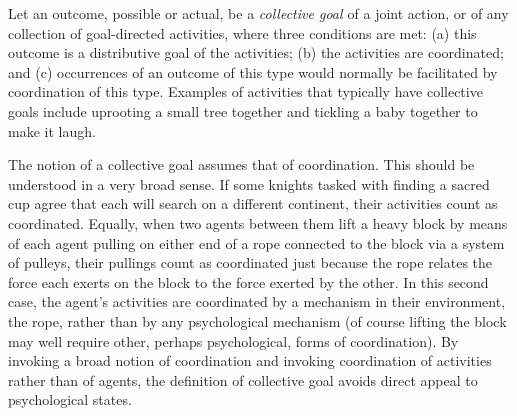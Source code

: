 \documentclass[12pt,a4paper]{extarticle}
\begin{document}
Let an outcome, possible or actual, be a \emph{collective goal \label{df_collective_goal}} of a joint action, or of any collection of goal-directed activities, where three conditions are met: (a) this outcome is a distributive goal of the activities; (b) the activities are coordinated; and (c)  occurrences of an outcome of this type would normally be facilitated by coordination of this type.  Examples of activities that typically have collective goals include uprooting a small tree together and tickling a baby together to make it laugh.

The notion of a collective goal assumes that of coordination.  This should be understood in a very broad sense.  If some knights tasked with finding a sacred cup agree that each will search on a different continent, their activities count as coordinated.  Equally, when two agents between them lift a heavy block by means of each agent pulling on either end of a rope connected to the block via a system of pulleys, their pullings count as coordinated just because the rope relates the force each exerts on the block to the force exerted by the other.  In this second case, the agent's activities are coordinated by a mechanism in their environment, the rope, rather than by any psychological mechanism (of course lifting the block may well require other, perhaps psychological, forms of coordination).  
By invoking a broad notion of coordination 
and invoking coordination of activities rather than of agents,
the definition of collective goal avoids direct appeal to psychological states.
\end{document}
